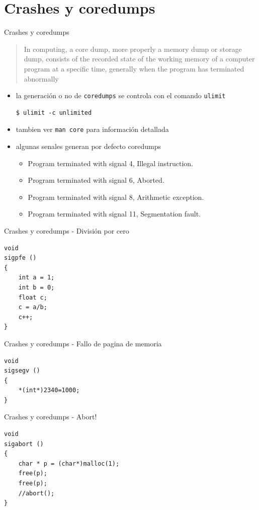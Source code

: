 \documentclass[xetex]{beamer}
\begin{document}
\section{Crashes y coredumps}
\begin{frame}[fragile]{Crashes y coredumps}
\begin{quotation}
In computing, a core dump, more properly a memory dump or storage dump,
consists of the recorded state of the working memory of a computer
program at a specific time, generally when the program has terminated
abnormally 
\end{quotation}

\begin{itemize}
\item la generación o no de \verb=coredumps= se controla con el comando \verb=ulimit=
\begin{verbatim}
$ ulimit -c unlimited
\end{verbatim}
\item tambien ver \verb=man core= para información detallada
\item algunas senales generan por defecto coredumps
\begin{itemize}
\item Program terminated with signal 4, Illegal instruction.
\item Program terminated with signal 6, Aborted.
\item Program terminated with signal 8, Arithmetic exception.
\item Program terminated with signal 11, Segmentation fault.
\end{itemize}
\end{itemize}
\end{frame}


\begin{frame}[fragile]{Crashes y coredumps - División por cero}
\begin{lstlisting}
void
sigpfe ()
{
    int a = 1;
    int b = 0;
    float c;
    c = a/b;
    c++;
}
\end{lstlisting}
\end{frame}

\begin{frame}[fragile]{Crashes y coredumps - Fallo de pagina de memoria}
\begin{lstlisting}
void
sigsegv ()
{
    *(int*)2340=1000;
}
\end{lstlisting}
\end{frame}

\begin{frame}[fragile]{Crashes y coredumps - Abort!}
\begin{lstlisting}
void
sigabort ()
{
    char * p = (char*)malloc(1);
    free(p);
    free(p);
    //abort();
}
\end{lstlisting}
\end{frame}
\end{document}
